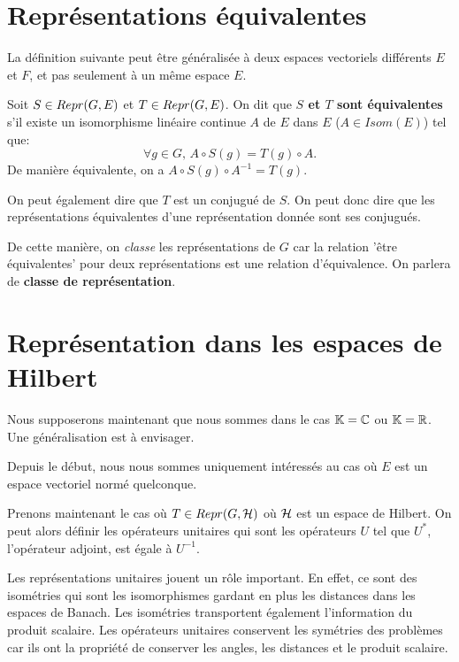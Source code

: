 \section{Représentations équivalentes}

La définition suivante peut être généralisée à deux espaces vectoriels
différents $E$ et $F$, et pas seulement à un même espace $E$.

\begin{definition}
	Soit $S \in Repr(G, E)$ et $T \in Repr(G, E)$.
	On dit que \textbf{$S$ et $T$ sont équivalentes} s'il existe un isomorphisme
	linéaire continue $A$ de $E$ dans $E$ ($A \in Isom(E)$) tel que:
	\begin{equation}
		\forall g \in G, \, A \circ S(g) = T(g) \circ A.
	\end{equation}
	De manière équivalente, on a $A \circ S(g) \circ A^{-1} = T(g)$.

	On peut également dire que $T$ est un conjugué de $S$. On peut donc dire que
	les représentations équivalentes d'une représentation donnée sont ses
	conjugués.
\end{definition}

De cette manière, on \textit{classe} les représentations de $G$ car la
relation 'être équivalentes' pour deux représentations est une relation
d'équivalence. On parlera de \textbf{classe de représentation}.


\section{Représentation dans les espaces de Hilbert}

Nous supposerons maintenant que nous sommes dans le cas $\mathbb{K} = \mathbb{C}$
ou $\mathbb{K} = \mathbb{R}$. Une généralisation est à envisager.

Depuis le début, nous nous sommes uniquement intéressés au cas où $E$ est un
espace vectoriel normé quelconque.

Prenons maintenant le cas où $T \in Repr(G, \mathcal{H})$ où $\mathcal{H}$ est un
espace de Hilbert.
On peut alors définir les opérateurs unitaires qui sont les opérateurs $U$ tel
que $U^{*}$, l'opérateur adjoint, est égale à $U^{-1}$.

Les représentations unitaires jouent un rôle important. En effet, ce sont des
isométries qui sont les isomorphismes gardant en plus les distances dans les
espaces de Banach. Les isométries transportent également l'information du
produit scalaire. Les opérateurs unitaires conservent les symétries des
problèmes car ils ont la propriété de conserver les angles, les distances et le
produit scalaire.

